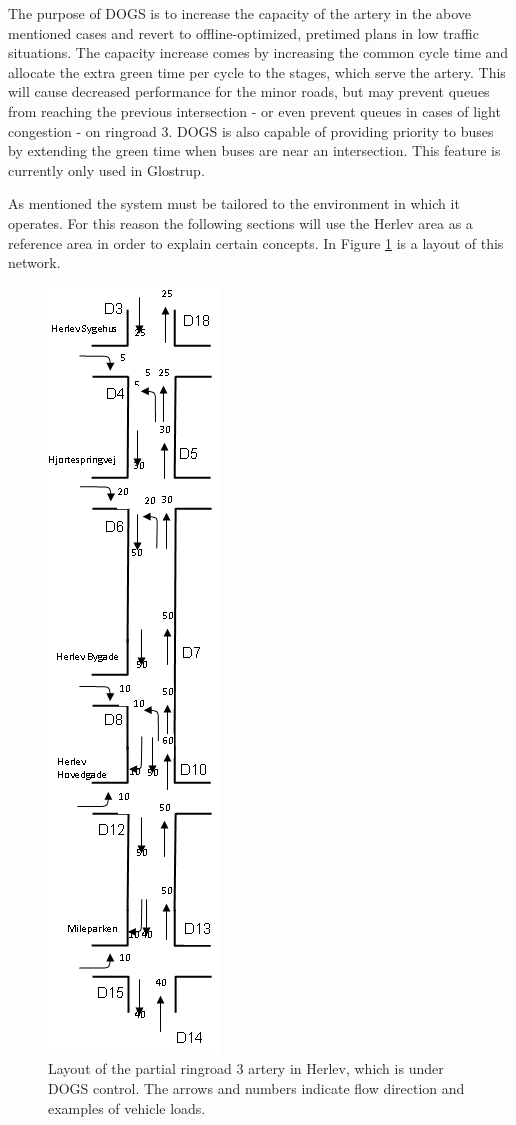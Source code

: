 The purpose of DOGS is to increase the capacity of the artery in the above mentioned cases and revert to offline-optimized, pretimed plans in low traffic situations. The capacity increase comes by increasing the common cycle time and allocate the extra green time per cycle to the stages, which serve the artery. This will cause decreased performance for the minor roads, but may prevent queues from reaching the previous intersection - or even prevent queues in cases of light congestion - on ringroad 3.
DOGS is also capable of providing priority to buses by extending the green time when buses are near an intersection. This feature is currently only used in Glostrup.

As mentioned the system must be tailored to the environment in which it operates. For this reason the following sections will use the Herlev area as a reference area in order to explain certain concepts. In Figure \ref{fig:dogs_herlev} is a layout of this network.

\begin{figure}[htbp]
\centering
\includegraphics[scale=0.5,angle=90]{dogs_herlev.png} 
\caption{Layout of the partial ringroad 3 artery in Herlev, which is under DOGS control. The arrows and numbers indicate flow direction and examples of vehicle loads.}
\label{fig:dogs_herlev}
\end{figure}


